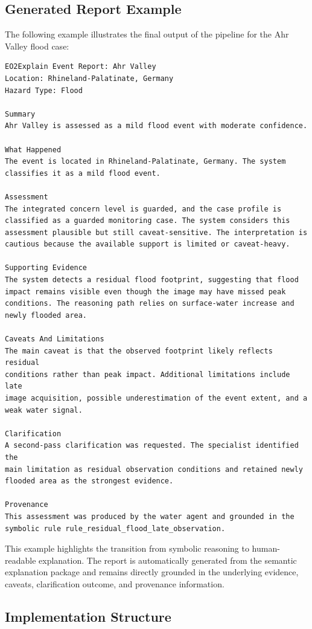 \documentclass[12pt]{article}
\begin{document}
\subsection{Generated Report Example}

The following example illustrates the final output of the pipeline for the Ahr Valley flood case:

\begin{lstlisting}
EO2Explain Event Report: Ahr Valley
Location: Rhineland-Palatinate, Germany
Hazard Type: Flood

Summary
Ahr Valley is assessed as a mild flood event with moderate confidence.

What Happened
The event is located in Rhineland-Palatinate, Germany. The system
classifies it as a mild flood event.

Assessment
The integrated concern level is guarded, and the case profile is
classified as a guarded monitoring case. The system considers this
assessment plausible but still caveat-sensitive. The interpretation is
cautious because the available support is limited or caveat-heavy.

Supporting Evidence
The system detects a residual flood footprint, suggesting that flood
impact remains visible even though the image may have missed peak
conditions. The reasoning path relies on surface-water increase and
newly flooded area.

Caveats And Limitations
The main caveat is that the observed footprint likely reflects residual
conditions rather than peak impact. Additional limitations include late
image acquisition, possible underestimation of the event extent, and a
weak water signal.

Clarification
A second-pass clarification was requested. The specialist identified the
main limitation as residual observation conditions and retained newly
flooded area as the strongest evidence.

Provenance
This assessment was produced by the water agent and grounded in the
symbolic rule rule_residual_flood_late_observation.
\end{lstlisting}

This example highlights the transition from symbolic reasoning to human-readable explanation. The report is automatically generated from the semantic explanation package and remains directly grounded in the underlying evidence, caveats, clarification outcome, and provenance information.

\subsection{Implementation Structure}
\end{document}
